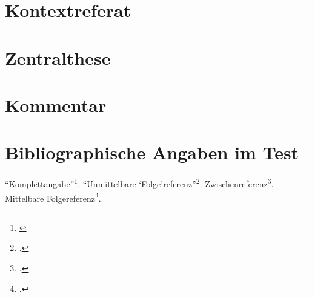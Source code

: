 %
%
%
%


%



\section{Kontextreferat}
\section{Zentralthese}
\section{Kommentar}

\section{Bibliographische Angaben im Test}

\enquote{Komplettangabe}\footnote{\cite[cf.][S.1]{Spielkamp2008a}}.
\enquote{Unmittelbare
\enquote{Folge}referenz}\footcite[cf.][S.2]{Spielkamp2008a}.
Zwischenreferenz\footcite[cf.][S.3]{DjoGehGraKreSpi2008a}. 
Mittelbare Folgereferenz\footcite[cf.][S.4]{Spielkamp2008a}.

%

